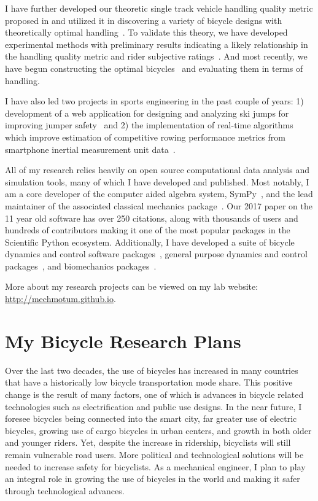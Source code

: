 \documentclass{article}
\begin{document}
I have further developed our theoretic single track vehicle handling quality
metric proposed in \cite{Hess2012} and utilized it in discovering a variety of
bicycle designs with theoretically optimal
handling~\cite{Moore2016,Moore2019a}. To validate this theory, we have
developed experimental methods with preliminary results indicating a likely
relationship in the handling quality metric and rider subjective
ratings~\cite{Kresie}. And most recently, we have begun constructing the
optimal bicycles~\cite{Gilboa2019a} and evaluating them in terms of handling.

I have also led two projects in sports engineering in the past couple of years:
1) development of a web application for designing and analyzing ski jumps for
improving jumper safety~\cite{Moore2018a,Cloud2019a} and 2) the implementation
of real-time algorithms which improve estimation of competitive rowing
performance metrics from smartphone inertial measurement unit
data~\cite{Cloud2019b}.

All of my research relies heavily on open source computational data analysis
and simulation tools, many  of which I have developed and published. Most
notably, I am a core developer of the computer aided algebra system,
SymPy~\cite{SymPyDevelopmentTeam2006}, and the lead maintainer of the associated
classical mechanics package~\cite{Gede2013}. Our 2017 paper \cite{Meurer2017}
on the 11 year old software has over 250 citations, along with thousands of
users and hundreds of contributors making it one of the most popular packages
in the Scientific Python ecosystem. Additionally, I have developed a suite of
bicycle dynamics and control software
packages~\cite{Moore2010b,Moore2011d,Moore2011a,Moore2011e}, general purpose
dynamics and control packages~\cite{Moore2014,Moore2011}, and biomechanics
packages~\cite{Dembia2011,Moore2011,Moore2011b,Moore2013b}.

More about my research projects can be viewed on my lab website:
\url{http://mechmotum.github.io}.

\section*{My Bicycle Research Plans}
%
Over the last two decades, the use of bicycles has increased in many countries
that have a historically low bicycle transportation mode share. This positive
change is the result of many factors, one of which is advances in bicycle
related technologies such as electrification and public use designs. In the
near future, I foresee bicycles being connected into the smart city, far greater
use of electric bicycles, growing use of cargo bicycles in urban centers, and
growth in both older and younger riders. Yet, despite the increase in
ridership, bicyclists will still remain vulnerable road users. More political
and technological solutions will be needed to increase safety for bicyclists.
As a mechanical engineer, I plan to play an integral role in growing the use of
bicycles in the world and making it safer through technological advances.
\end{document}
